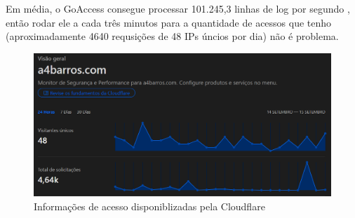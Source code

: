 

Em média, o GoAccess consegue processar 101.245,3 linhas de log por segundo \cite{goaccess-speed},
então rodar ele a cada três minutos para a quantidade de acessos que tenho (aproximadamente 4640 requsições
de 48 IPs úncios por dia) não é problema.

\begin{figure}[ht]
    \begin{center}
    \includegraphics[width=400pt]{img/cloudflare-stat.png}
    \caption{Informações de acesso disponiblizadas pela Cloudflare}
    \label{fig:cloudflare-stat.png}
    \end{center}
\end{figure}
